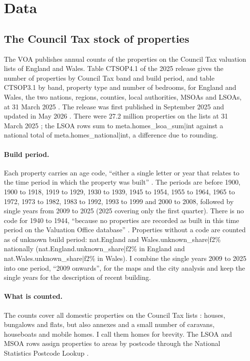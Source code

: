 \section{Data}
\label{sec:data}
\subsection{The Council Tax stock of properties}
The VOA publishes annual counts of the properties on the Council Tax valuation lists of England and Wales. Table CTSOP4.1 of the 2025 release gives the number of properties by Council Tax band and build period, and table CTSOP3.1 by band, property type and number of bedrooms, for England and Wales, the two nations, regions, counties, local authorities, MSOAs and LSOAs, at 31 March 2025 \citep{voa2025}. The release was first published in September 2025 and updated in May 2026 \citep{voa2025com}. There were 27.2 million properties on the lists at 31 March 2025 \citep{voa2025com}; the LSOA rows sum to {{meta.homes_lsoa_sum|int}} against a national total of {{meta.homes_national|int}}, a difference due to rounding.

\paragraph{Build period.} Each property carries an age code, ``either a single letter or year that relates to the time period in which the property was built'' \citep{voa2025bg}. The periods are before 1900, 1900 to 1918, 1919 to 1929, 1930 to 1939, 1945 to 1954, 1955 to 1964, 1965 to 1972, 1973 to 1982, 1983 to 1992, 1993 to 1999 and 2000 to 2008, followed by single years from 2009 to 2025 (2025 covering only the first quarter). There is no code for 1940 to 1944, ``because no properties are recorded as built in this time period on the Valuation Office database'' \citep{voa2025bg}. Properties without a code are counted as of unknown build period: {{nat.England and Wales.unknown_share|f2}}\% nationally ({{nat.England.unknown_share|f2}}\% in England and {{nat.Wales.unknown_share|f2}}\% in Wales). I combine the single years 2009 to 2025 into one period, ``2009 onwards'', for the maps and the city analysis and keep the single years for the description of recent building.

\paragraph{What is counted.} The counts cover all domestic properties on the Council Tax lists \citep{voa2025bg}: houses, bungalows and flats, but also annexes and a small number of caravans, houseboats and mobile homes. I call them homes for brevity. The LSOA and MSOA rows assign properties to areas by postcode through the National Statistics Postcode Lookup \citep{voa2025bg}.

